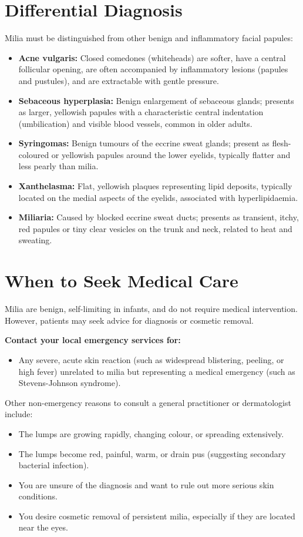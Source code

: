 \section*{Differential Diagnosis}
Milia must be distinguished from other benign and inflammatory facial papules:
\begin{itemize}
    \item \textbf{Acne vulgaris:} Closed comedones (whiteheads) are softer, have a central follicular opening, are often accompanied by inflammatory lesions (papules and pustules), and are extractable with gentle pressure.
    \item \textbf{Sebaceous hyperplasia:} Benign enlargement of sebaceous glands; presents as larger, yellowish papules with a characteristic central indentation (umbilication) and visible blood vessels, common in older adults.
    \item \textbf{Syringomas:} Benign tumours of the eccrine sweat glands; present as flesh-coloured or yellowish papules around the lower eyelids, typically flatter and less pearly than milia.
    \item \textbf{Xanthelasma:} Flat, yellowish plaques representing lipid deposits, typically located on the medial aspects of the eyelids, associated with hyperlipidaemia.
    \item \textbf{Miliaria:} Caused by blocked eccrine sweat ducts; presents as transient, itchy, red papules or tiny clear vesicles on the trunk and neck, related to heat and sweating.
\end{itemize}

\section*{When to Seek Medical Care}
Milia are benign, self-limiting in infants, and do not require medical intervention. However, patients may seek advice for diagnosis or cosmetic removal.

\textbf{Contact your local emergency services for:}
\begin{itemize}
    \item Any severe, acute skin reaction (such as widespread blistering, peeling, or high fever) unrelated to milia but representing a medical emergency (such as Stevens-Johnson syndrome).
\end{itemize}

Other non-emergency reasons to consult a general practitioner or dermatologist include:
\begin{itemize}
    \item The lumps are growing rapidly, changing colour, or spreading extensively.
    \item The lumps become red, painful, warm, or drain pus (suggesting secondary bacterial infection).
    \item You are unsure of the diagnosis and want to rule out more serious skin conditions.
    \item You desire cosmetic removal of persistent milia, especially if they are located near the eyes.
\end{itemize}

